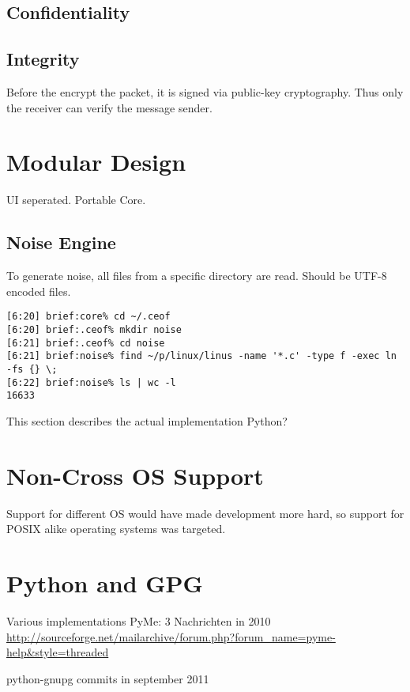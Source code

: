 \subsection{Confidentiality}

\subsection{Integrity}
Before the encrypt the packet, it is signed via public-key
cryptography\cite{pgp-1}. Thus only the receiver can verify the message sender.


\section{Modular Design}
UI seperated.
Portable Core.
\subsection{Noise Engine}
To generate noise, all files from a specific directory are read.
Should be UTF-8 encoded files.

\begin{verbatim}
[6:20] brief:core% cd ~/.ceof 
[6:20] brief:.ceof% mkdir noise
[6:21] brief:.ceof% cd noise 
[6:21] brief:noise% find ~/p/linux/linus -name '*.c' -type f -exec ln -fs {} \;
[6:22] brief:noise% ls | wc -l
16633
\end{verbatim}

This section describes the actual implementation
Python?
\section{Non-Cross OS Support}
Support for different OS would have made development more
hard, so support for POSIX alike operating systems was targeted.

\section{Python and GPG}
Various implementations \cite{python-gpg}
PyMe: 3 Nachrichten in 2010
\url{http://sourceforge.net/mailarchive/forum.php?forum_name=pyme-help&style=threaded}

python-gnupg commits in september 2011 \cite{python-gnupg}

